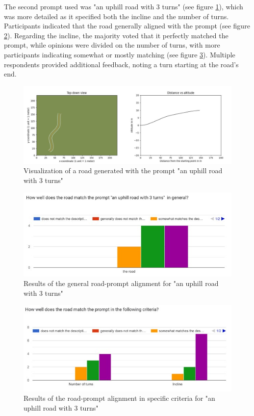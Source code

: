 The second prompt used was "an uphill road with 3 turns" (see figure \ref{u3t-vis}), which was more detailed as it specified both the incline and the number of turns. Participants indicated that the road generally aligned with the prompt (see figure \ref{u3t-general-alignment}). Regarding the incline, the majority voted that it perfectly matched the prompt, while opinions were divided on the number of turns, with more participants indicating somewhat or mostly matching (see figure \ref{u3t-specific-alignment}). Multiple respondents provided additional feedback, noting a turn starting at the road's end.

\begin{figure}[H]
    \centering
    \includegraphics[width=0.75\linewidth]{images/road1.jpg}
    \caption{Visualization of a road generated with the prompt "an uphill road with 3 turns"}
    \label{u3t-vis}
\end{figure}

\begin{figure}[H]
    \centering
    \includegraphics[width=0.75\linewidth]{images/u3t_general.jpg}
    \caption{Results of the general road-prompt alignment for "an uphill road with 3 turns"}
    \label{u3t-general-alignment}
\end{figure}

\begin{figure}[H]
    \centering
    \includegraphics[width=0.75\linewidth]{images/u3t_criteria.jpg}
    \caption{Results of the road-prompt alignment in specific criteria for "an uphill road with 3 turns"}
    \label{u3t-specific-alignment}
\end{figure}


